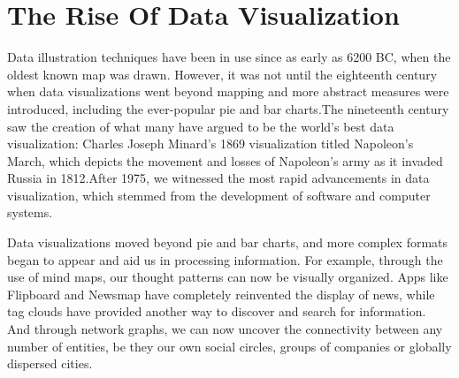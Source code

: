 \documentclass[]{report}
\begin{document}
\section{The Rise Of Data Visualization}
Data illustration techniques have been in use since as early as 6200 BC, when the oldest known map was drawn. However, it was not until the eighteenth century when data visualizations went beyond mapping and more abstract measures were introduced, including the ever-popular pie and bar charts.The nineteenth century saw the creation of what many have argued to be the world’s best data visualization: Charles Joseph Minard’s 1869 visualization titled Napoleon’s March, which depicts the movement and losses of Napoleon’s army as it invaded Russia in 1812.After 1975, we witnessed the most rapid advancements in data visualization, which stemmed from the development of software and computer systems.\par 
Data visualizations moved beyond pie and bar charts, and more complex formats began to appear and aid us in processing information. For example, through the use of mind maps, our thought patterns can now be visually organized. Apps like Flipboard and Newsmap have completely reinvented the display of news, while tag clouds have provided another way to discover and search for information. And through network graphs, we can now uncover the connectivity between any number of entities, be they our own social circles, groups of companies or globally dispersed cities.
\end{document}
